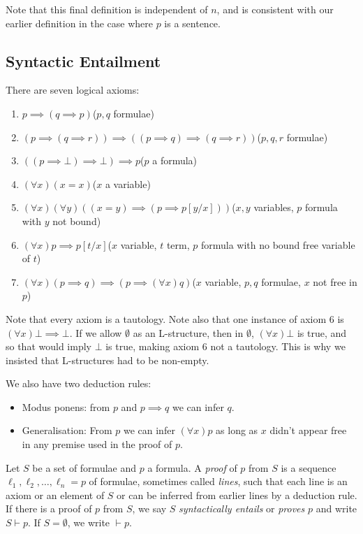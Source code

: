 \documentclass[10pt,a4paper]{article}
\begin{document}
Note that this final definition is independent of $n$, and is consistent with our earlier definition in the case where $p$ is a sentence.

\subsection{Syntactic Entailment}
There are seven logical axioms:
\begin{enumerate}
\item $p \implies (q \implies p)$\hfill($p,q$ formulae)
\item $(p \implies (q\implies r))\implies((p\implies q)\implies (q \implies r))$\hfill($p,q,r$ formulae)
\item $((p \implies \bot)\implies \bot)\implies p$\hfill($p$ a formula)
\item $(\forall x)(x=x)$\hfill($x$ a variable)
\item $(\forall x)(\forall y)((x=y) \implies (p \implies p[y/x]))$\hfill($x,y$ variables, $p$ formula with $y$ not bound)
\item $(\forall x)p \implies p[t/x]$\hfill($x$ variable, $t$ term, $p$ formula with no bound free variable of $t$)
\item $(\forall x)(p\implies q)\implies(p\implies (\forall x) q)$\hfill($x$ variable, $p,q$ formulae, $x$ not free in $p$)
\end{enumerate}
Note that every axiom is a tautology. Note also that one instance of axiom $6$ is $(\forall x)\bot \implies \bot$. If we allow $\emptyset$ as an L-structure, then in $\emptyset$, $(\forall x)\bot$ is true, and so that would imply $\bot$ is true, making axiom 6 not a tautology. This is why we insisted that L-structures had to be non-empty.

We also have two deduction rules:
\begin{itemize}
\item Modus ponens: from $p$ and $p\implies q$ we can infer $q$.
\item Generalisation: From $p$ we can infer $(\forall x)p$ as long as $x$ didn't appear free in any premise used in the proof of $p$.
\end{itemize}
Let $S$ be a set of formulae and $p$ a formula. A \emph{proof} of $p$ from $S$ is a sequence $\ell_1, \ell_2, \ldots, \ell_n =p$ of formulae, sometimes called \emph{lines}, such that each line is an axiom or an element of $S$ or can be inferred from earlier lines by a deduction rule. If there is a proof of $p$ from $S$, we say $S$ \emph{syntactically entails} or \emph{proves} $p$ and write $S \vdash p$. If $S = \emptyset$, we write $\vdash p$.
\end{document}
